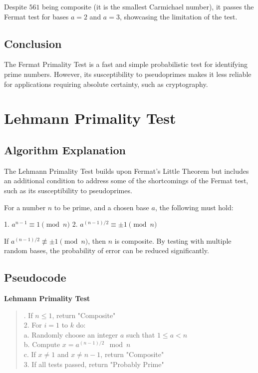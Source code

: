 \documentclass[12pt]{article}
\begin{document}
Despite \( 561 \) being composite (it is the smallest Carmichael number), it passes the Fermat test for bases \( a = 2 \) and \( a = 3 \), showcasing the limitation of the test.

\subsection*{Conclusion}

The Fermat Primality Test is a fast and simple probabilistic test for identifying prime numbers. However, its susceptibility to pseudoprimes makes it less reliable for applications requiring absolute certainty, such as cryptography.



\section{Lehmann Primality Test}

\subsection*{Algorithm Explanation}

The Lehmann Primality Test builds upon Fermat's Little Theorem but includes an additional condition to address some of the shortcomings of the Fermat test, such as its susceptibility to pseudoprimes.

For a number \( n \) to be prime, and a chosen base \( a \), the following must hold:

1. \( a^{n-1} \equiv 1 \pmod{n} \)
2. \( a^{(n-1)/2} \equiv \pm1 \pmod{n} \)

If \( a^{(n-1)/2} \not\equiv \pm1 \pmod{n} \), then \( n \) is composite. By testing with multiple random bases, the probability of error can be reduced significantly.

\subsection*{Pseudocode}

\textbf{Lehmann Primality Test}


\begin{quote}. If \( n \leq 1 \), return "Composite" \\
2. For \( i = 1 \) to \( k \) do: \\
\hspace*{2em} a. Randomly choose an integer \( a \) such that \( 1 \leq a < n \) \\
\hspace*{2em} b. Compute \( x = a^{(n-1)/2} \mod n \) \\
\hspace*{2em} c. If \( x \neq 1 \) and \( x \neq n-1 \), return "Composite" \\
3. If all tests passed, return "Probably Prime"
\end{quote}
\end{document}
